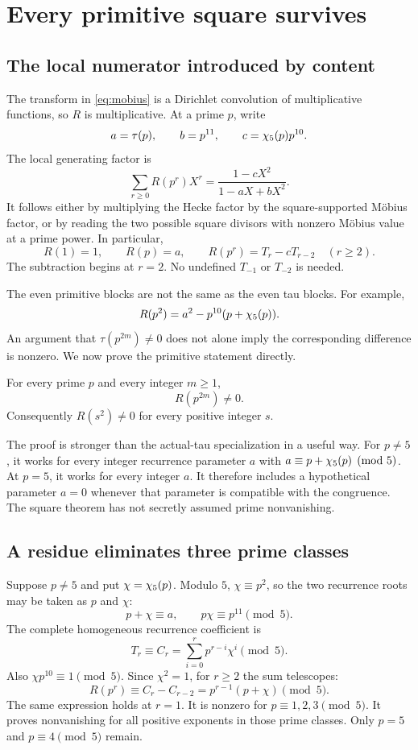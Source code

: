 \chapter{Every primitive square survives}\label{ch:even}
\section{The local numerator introduced by content}
The transform in \eqref{eq:mobius} is a Dirichlet convolution of multiplicative functions, so $R$ is multiplicative. At a prime $p$, write
\[
a=\tau(p),\qquad b=p^{11},\qquad c=\chi_5(p)p^{10}.
\]
The local generating factor is
\begin{equation}\label{eq:rlocal}
\boxed{\sum_{r\ge0}R(p^r)X^r
=\frac{1-cX^2}{1-aX+bX^2}.}
\end{equation}
It follows either by multiplying the Hecke factor by the square-supported Möbius factor, or by reading the two possible square divisors with nonzero Möbius value at a prime power. In particular,
\[
R(1)=1,\qquad R(p)=a,\qquad
R(p^r)=T_r-cT_{r-2}\quad(r\ge2).
\]
The subtraction begins at $r=2$. No undefined $T_{-1}$ or $T_{-2}$ is needed.

The even primitive blocks are not the same as the even tau blocks. For example,
\[
R(p^2)=a^2-p^{10}(p+\chi_5(p)).
\]
An argument that $\tau(p^{2m})\ne0$ does not alone imply the corresponding difference is nonzero. We now prove the primitive statement directly.

\begin{theorem}\label{thm:primitiveeven}
For every prime $p$ and every integer $m\ge1$,
\[
R(p^{2m})\ne0.
\]
Consequently $R(s^2)\ne0$ for every positive integer $s$.
\end{theorem}

The proof is stronger than the actual-tau specialization in a useful way. For $p\ne5$, it works for every integer recurrence parameter $a$ with $a\equiv p+\chi_5(p)\pmod5$. At $p=5$, it works for every integer $a$. It therefore includes a hypothetical parameter $a=0$ whenever that parameter is compatible with the congruence. The square theorem has not secretly assumed prime nonvanishing.

\section{A residue eliminates three prime classes}
Suppose $p\ne5$ and put $\chi=\chi_5(p)$. Modulo $5$, $\chi\equiv p^2$, so the two recurrence roots may be taken as $p$ and $\chi$:
\[
p+\chi\equiv a,\qquad p\chi\equiv p^{11}\pmod5.
\]
The complete homogeneous recurrence coefficient is
\[
T_r\equiv C_r=\sum_{i=0}^r p^{r-i}\chi^i\pmod5.
\]
Also $\chi p^{10}\equiv1\pmod5$. Since $\chi^2=1$, for $r\ge2$ the sum telescopes:
\begin{equation}\label{eq:rmod5}
R(p^r)\equiv C_r-C_{r-2}
=p^{r-1}(p+\chi)\pmod5.
\end{equation}
The same expression holds at $r=1$. It is nonzero for $p\equiv1,2,3\pmod5$. It proves nonvanishing for all positive exponents in those prime classes. Only $p=5$ and $p\equiv4\pmod5$ remain.


